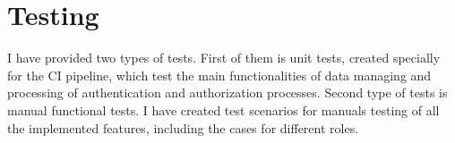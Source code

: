 \chapter{Testing} I have provided two types of tests. First of them is unit tests, created specially for the CI pipeline, which test the main functionalities of data managing and processing of authentication and  authorization processes. Second type of tests is manual functional tests. I have created test scenarios for manuals testing of all the implemented features, including the cases for different roles.







